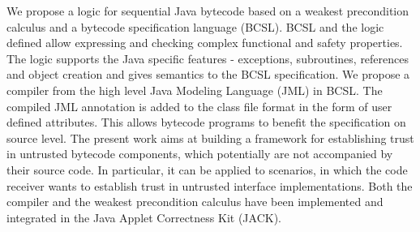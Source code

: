 We propose a logic for sequential Java bytecode based on a weakest precondition calculus and a bytecode specification language (BCSL). BCSL and the logic defined allow expressing and checking complex functional and safety properties. The logic supports the Java specific features - exceptions, subroutines, references and object creation and gives semantics to the BCSL specification. We propose a compiler from the high level Java Modeling Language (JML) in BCSL. The compiled JML annotation is added to the class file format in the form of user defined attributes. This allows bytecode programs to benefit the specification on source level. The present work aims at building a framework for establishing trust in untrusted bytecode components, which potentially are not accompanied by their source code. In particular, it can be applied to scenarios, in which the code receiver wants to establish trust in untrusted interface implementations. Both the compiler and the weakest precondition calculus have been implemented and integrated in the Java Applet Correctness Kit (JACK).

